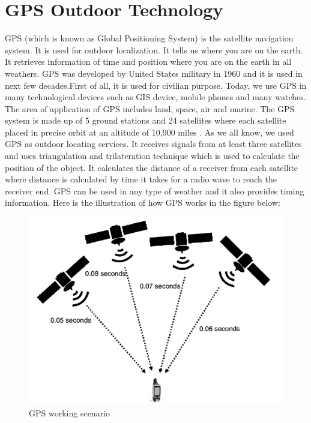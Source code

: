 \section{GPS Outdoor Technology}
GPS (which is known as Global Positioning System) is the satellite navigation system. It is used for outdoor localization. It tells us where you are on the earth. It retrieves information of time and position where you are on the earth in all weathers. GPS was developed by United States military in 1960 and it is used in next few decades.First of all, it is used for civilian purpose. Today, we use GPS in many technological devices such as GIS device, mobile phones and many watches. The area of application of GPS includes land, space, air and marine. The GPS system is made up of 5 ground stations and 24 satellites where each satellite placed in precise orbit at an altitude of 10,900 miles \cite{GPSworks}. As we all know, we used GPS as outdoor locating services. It receives signals from at least three satellites and uses triangulation and trilateration technique which is used to calculate the position of the object. It calculates the distance of a receiver from each satellite where distance is calculated by time it takes for a radio wave to reach the receiver end. GPS can be used in any type of weather and it also provides timing information. Here is the illustration of how GPS works in the figure below:
\clearpage
\begin{figure}[h]
  		\centering
    		\includegraphics[scale=0.6]{./Figures/GPS}
\caption{GPS working scenario}
\label{fig:1}
 		\end{figure}
    

